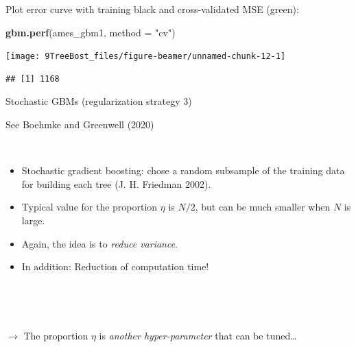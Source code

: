 \documentclass[
  10pt,
  ignorenonframetext,
]{beamer}
\newenvironment{Shaded}{\begin{snugshade}}{\end{snugshade}}
\newcommand{\AttributeTok}[1]{\textcolor[rgb]{0.13,0.29,0.53}{#1}}
\newcommand{\FunctionTok}[1]{\textcolor[rgb]{0.13,0.29,0.53}{\textbf{#1}}}
\newcommand{\NormalTok}[1]{#1}
\newcommand{\StringTok}[1]{\textcolor[rgb]{0.31,0.60,0.02}{#1}}
\providecommand{\tightlist}{%
  \setlength{\itemsep}{0pt}\setlength{\parskip}{0pt}}
\begin{document}
\begin{frame}[fragile]
Plot error curve with training black and cross-validated MSE (green):

\vspace{2mm}

\scriptsize

\begin{Shaded}
\begin{Highlighting}[]
\FunctionTok{gbm.perf}\NormalTok{(ames\_gbm1, }\AttributeTok{method =} \StringTok{"cv"}\NormalTok{)}
\end{Highlighting}
\end{Shaded}

\begin{center}\texttt{[image: 9TreeBost\_files/figure-beamer/unnamed-chunk-12-1]} \end{center}

\begin{verbatim}
## [1] 1168
\end{verbatim}
\end{frame}

\begin{frame}
\begin{block}{Stochastic GBMs (regularization strategy 3)}
\protect\hypertarget{stochastic-gbms-regularization-strategy-3}{}
\scriptsize

See Boehmke and Greenwell (2020)

\(~\) \normalsize

\begin{itemize}
\tightlist
\item
  Stochastic gradient boosting: chose a random subsample of the training
  data for building each tree (J. H. Friedman 2002).
\end{itemize}

\vspace{2mm}

\begin{itemize}
\tightlist
\item
  Typical value for the proportion \(\eta\) is \(N/2\), but can be much
  smaller when \(N\) is large.
\end{itemize}

\vspace{2mm}

\begin{itemize}
\tightlist
\item
  Again, the idea is to \emph{reduce variance}.
\end{itemize}

\vspace{2mm}

\begin{itemize}
\tightlist
\item
  In addition: Reduction of computation time!
\end{itemize}

\(~\)

\(~\)

\(\rightarrow\) The proportion \(\eta\) is \emph{another
hyper-parameter} that can be tuned\ldots{}
\end{block}
\end{frame}
\end{document}
